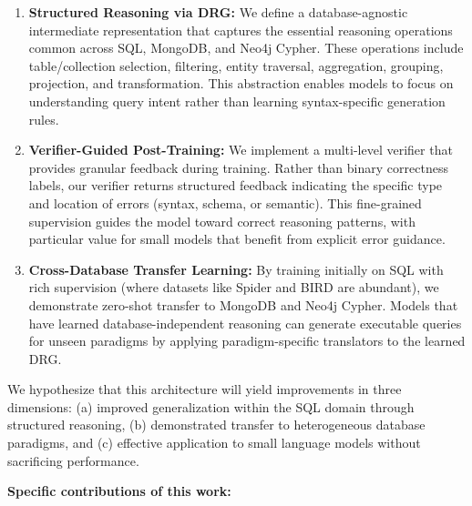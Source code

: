\documentclass[conference]{IEEEtran}
\begin{document}
\begin{enumerate}
\item \textbf{Structured Reasoning via DRG:} We define a database-agnostic intermediate representation that captures the essential reasoning operations common across SQL, MongoDB, and Neo4j Cypher. These operations include table/collection selection, filtering, entity traversal, aggregation, grouping, projection, and transformation. This abstraction enables models to focus on understanding query intent rather than learning syntax-specific generation rules.

\item \textbf{Verifier-Guided Post-Training:} We implement a multi-level verifier that provides granular feedback during training. Rather than binary correctness labels, our verifier returns structured feedback indicating the specific type and location of errors (syntax, schema, or semantic). This fine-grained supervision guides the model toward correct reasoning patterns, with particular value for small models that benefit from explicit error guidance.

\item \textbf{Cross-Database Transfer Learning:} By training initially on SQL with rich supervision (where datasets like Spider and BIRD are abundant), we demonstrate zero-shot transfer to MongoDB and Neo4j Cypher. Models that have learned database-independent reasoning can generate executable queries for unseen paradigms by applying paradigm-specific translators to the learned DRG.
\end{enumerate}

We hypothesize that this architecture will yield improvements in three dimensions: (a) improved generalization within the SQL domain through structured reasoning, (b) demonstrated transfer to heterogeneous database paradigms, and (c) effective application to small language models without sacrificing performance.

\textbf{Specific contributions of this work:}
\end{document}
